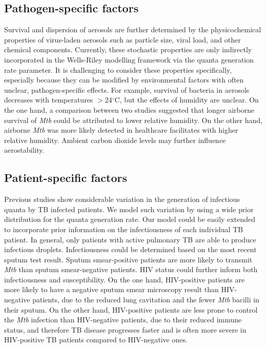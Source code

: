 \documentclass[fleqn,11pt]{wlscirep_supp}
\begin{document}
\subsection{Pathogen-specific factors}

Survival and dispersion of aerosols are further determined by the physicochemical properties of virus-laden aerosols such as particle size, viral load, and other chemical components\cite{Wang2021Science}. Currently, these stochastic properties are only indirectly incorporated in the Wells-Riley modelling framework via the quanta generation rate parameter\cite{Riley1961Book,Rudnick2003IndoorAir}. It is challenging to consider these properties specifically, especially because they can be modified by environmental factors with often unclear, pathogen-specific effects\cite{Songer1967,Chan2011AdvVir,Fernstrom2013JoP,Cox1995Book,Fernstrom2013JoP,Tang2009Interface}. For example, survival of bacteria in aerosols decreases with temperatures $>$24$^{\circ}$C, but the effects of humidity are unclear\cite{Tang2009Interface}. On the one hand, a comparison between two studies suggested that longer airborne survival of \emph{Mtb} could be attributed to lower relative humidity\cite{Loudon1969AMRRD,Lever2000LettersAppliedMicrobio}. On the other hand, airborne \emph{Mtb} was more likely detected in healthcare facilitates with higher relative humidity\cite{Sornboot2019IJTLD,Matuka2021IJERP}. Ambient carbon dioxide levels may further influence aerostability\cite{Haddrell2024NatCommun}.    

\subsection{Patient-specific factors}

Previous studies show considerable variation in the generation of infectious quanta by TB infected patients\cite{Escombe2008PLoSMed,Andrews2014JID}. We model such variation by using a wide prior distribution for the quanta generation rate. Our model could be easily extended to incorporate prior information on the infectiousness of each individual TB patient. In general, only patients with active pulmonary TB are able to produce infectious droplets\cite{Rieder1999}. Infectiousness could be determined based on the most recent sputum test result. Sputum smear-positive patients are more likely to transmit \emph{Mtb} than sputum smear-negative patients\cite{Shaw1954ART,Brindle1993AMRRD,Grzybowski1975BIUT}. HIV status could further inform both infectiousness and susceptibility. On the one hand, HIV-positive patients are more likely to have a negative sputum smear microscopy result than HIV-negative patients, due to the reduced lung cavitation and the fewer \emph{Mtb} bacilli in their sputum\cite{Brindle1993AMRRD,Telzak1997CID}. On the other hand, HIV-positive patients are less prone to control the \emph{Mtb} infection than HIV-negative patients, due to their reduced immune status\cite{Forte1992AIDS,Kwan2011CMR,Shen1988CEI}, and therefore TB disease progresses faster and is often more severe in HIV-positive TB patients compared to HIV-negative ones. 
\end{document}
